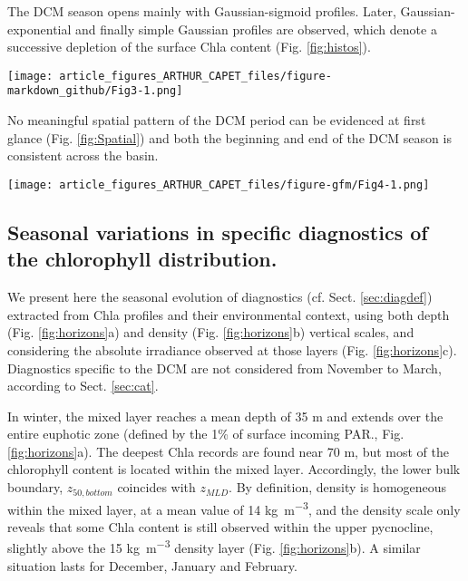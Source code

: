 \documentclass[journal abbreviation, manuscript]{copernicus}
\begin{document}
The DCM season opens mainly with Gaussian-sigmoid profiles.
Later, Gaussian-exponential and finally simple Gaussian profiles are observed, which denote a successive depletion of the surface Chla content (Fig. \ref{fig:histos}). 

\begin{figure*}[h!] %
    \texttt{[image: article\_figures\_ARTHUR\_CAPET\_files/figure-markdown\_github/Fig3-1.png]}
    \caption{Percentage of best-fitting forms for Chla profiles for each month. Number of profiles are given on the horizontal axis.}
    \label{fig:histos}
\end{figure*}

No meaningful spatial pattern of the DCM period can be evidenced at first glance (Fig. \ref{fig:Spatial}) and both the beginning and end of the DCM season is consistent across the basin.

\begin{figure*}[h!] 
    \texttt{[image: article\_figures\_ARTHUR\_CAPET\_files/figure-gfm/Fig4-1.png]}
    \caption{Monthly spatial distribution of DCM and non-DCM profiles indicates homogeneous DCM dynamics in the open basin. This map was created using tiles by Stamen Design, under CC BY 3.0 with data from \textcopyright~OpenStreetMap contributors 2020, distributed under a Creative Commons BY-SA License.}
    \label{fig:Spatial}
\end{figure*}

\subsection{Seasonal variations in specific diagnostics of the chlorophyll distribution.}
\label{sec:horizons}
We present here the seasonal evolution of diagnostics (cf. Sect. \ref{sec:diagdef}) extracted from Chla profiles and their environmental context, using both depth (Fig. \ref{fig:horizons}a) and density (Fig. \ref{fig:horizons}b) vertical scales, and considering the absolute irradiance observed at those layers (Fig. \ref{fig:horizons}c).
Diagnostics specific to the DCM are not considered from November to March, according to Sect. \ref{sec:cat}.

In winter, the mixed layer reaches a mean depth of 35 \unit{m} and extends over the entire euphotic zone (defined by the 1\% of surface incoming PAR., Fig. \ref{fig:horizons}a).
The deepest Chla records are found near 70 \unit{m}, but most of the chlorophyll content is located within the mixed layer. Accordingly, the lower bulk boundary, $z_{50,bottom}$ coincides with $z_{MLD}$. By definition, density is homogeneous within the mixed layer, at a mean value of 14 \unit{kg~m^{-3}},  and the density scale only reveals that some Chla content is still observed within the upper pycnocline, slightly above the 15 \unit{kg~m^{-3}} density layer (Fig. \ref{fig:horizons}b).
A similar situation lasts for December, January and February.
\end{document}
